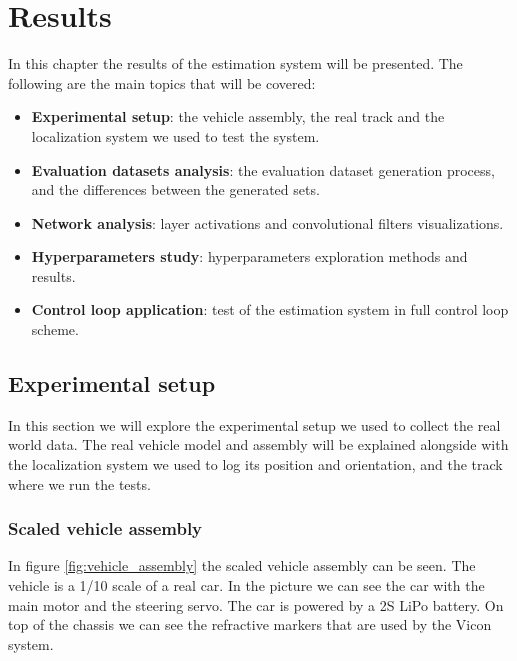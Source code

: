 \documentclass[a4paper,12pt,sort&compress]{article}
\begin{document}
\pagebreak

\section{Results} \label{sec:results}
    In this chapter the results of the estimation system will be presented. The following are the
    main topics that will be covered:
    \begin{itemize}
        \item \textbf{Experimental setup}: the vehicle assembly, the real track and the localization
        system we used to test the system.
        \item \textbf{Evaluation datasets analysis}: the evaluation dataset generation process, and the
        differences between the generated sets.
        \item \textbf{Network analysis}: layer activations and convolutional filters visualizations.
        \item \textbf{Hyperparameters study}: hyperparameters exploration methods and results.
        \item \textbf{Control loop application}: test of the estimation system in full control loop scheme.
    \end{itemize}

\pagebreak


\subsection{Experimental setup} \label{sec:exp_setup}
    In this section we will explore the experimental setup we used to collect the real world data.
    The real vehicle model and assembly will be explained alongside with the localization system we
    used to log its position and orientation, and the track where we run the tests.

\subsubsection*{Scaled vehicle assembly}

    In figure \ref{fig:vehicle_assembly} the scaled vehicle assembly can be seen. The vehicle is a 1/10 scale
    of a real car. In the picture we can see the car with the main motor and the steering servo. The
    car is powered by a 2S LiPo battery. On top of the chassis we can see the refractive markers
    that are used by the Vicon system.  
\end{document}

